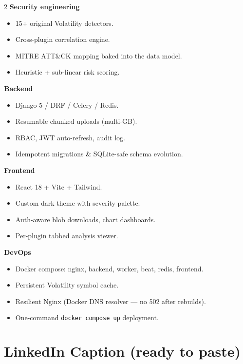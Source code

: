 \documentclass[11pt,a4paper]{article}
\begin{document}
\begin{multicols}{2}
\textbf{Security engineering}
\begin{itemize}[leftmargin=1.2em,itemsep=1pt]
\item 15+ original Volatility detectors.
\item Cross-plugin correlation engine.
\item MITRE ATT\&CK mapping baked into the data model.
\item Heuristic + sub-linear risk scoring.
\end{itemize}

\textbf{Backend}
\begin{itemize}[leftmargin=1.2em,itemsep=1pt]
\item Django 5 / DRF / Celery / Redis.
\item Resumable chunked uploads (multi-GB).
\item RBAC, JWT auto-refresh, audit log.
\item Idempotent migrations \& SQLite-safe schema evolution.
\end{itemize}

\textbf{Frontend}
\begin{itemize}[leftmargin=1.2em,itemsep=1pt]
\item React 18 + Vite + Tailwind.
\item Custom dark theme with severity palette.
\item Auth-aware blob downloads, chart dashboards.
\item Per-plugin tabbed analysis viewer.
\end{itemize}

\textbf{DevOps}
\begin{itemize}[leftmargin=1.2em,itemsep=1pt]
\item Docker compose: nginx, backend, worker, beat, redis, frontend.
\item Persistent Volatility symbol cache.
\item Resilient Nginx (Docker DNS resolver — no 502 after rebuilds).
\item One-command \texttt{docker compose up} deployment.
\end{itemize}
\end{multicols}

\section{LinkedIn Caption (ready to paste)}
\end{document}
